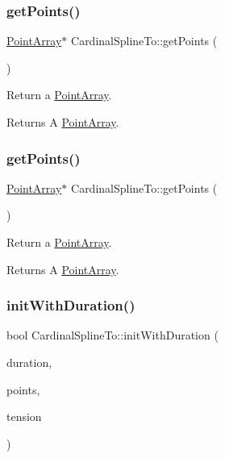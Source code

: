\subsubsection{\texorpdfstring{get\+Points()}{getPoints()}\hspace{0.1cm}{\footnotesize\ttfamily [1/2]}}
{\footnotesize\ttfamily \hyperlink{classPointArray}{Point\+Array}$\ast$ Cardinal\+Spline\+To\+::get\+Points (\begin{DoxyParamCaption}{ }\end{DoxyParamCaption})\hspace{0.3cm}{\ttfamily [inline]}}

Return a \hyperlink{classPointArray}{Point\+Array}.

\begin{DoxyReturn}{Returns}
A \hyperlink{classPointArray}{Point\+Array}. 
\end{DoxyReturn}
\mbox{\label{classCardinalSplineTo_a81579b21c78debeaeca0063b46bf9a9d}} 
\subsubsection{\texorpdfstring{get\+Points()}{getPoints()}\hspace{0.1cm}{\footnotesize\ttfamily [2/2]}}
{\footnotesize\ttfamily \hyperlink{classPointArray}{Point\+Array}$\ast$ Cardinal\+Spline\+To\+::get\+Points (\begin{DoxyParamCaption}{ }\end{DoxyParamCaption})\hspace{0.3cm}{\ttfamily [inline]}}

Return a \hyperlink{classPointArray}{Point\+Array}.

\begin{DoxyReturn}{Returns}
A \hyperlink{classPointArray}{Point\+Array}. 
\end{DoxyReturn}
\mbox{\label{classCardinalSplineTo_ac20ad3890618649914a42710e9eee434}} 
\subsubsection{\texorpdfstring{init\+With\+Duration()}{initWithDuration()}\hspace{0.1cm}{\footnotesize\ttfamily [1/2]}}
{\footnotesize\ttfamily bool Cardinal\+Spline\+To\+::init\+With\+Duration (\begin{DoxyParamCaption}\item[{float}]{duration,  }\item[{\hyperlink{classPointArray}{Point\+Array} $\ast$}]{points,  }\item[{float}]{tension }\end{DoxyParamCaption})}

